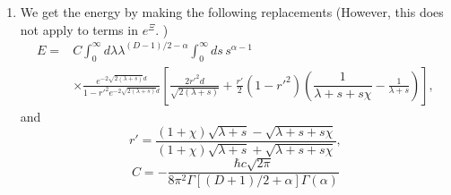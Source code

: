 \begin{enumerate}
\item We get the energy by making the following replacements  
(However, this does not apply to terms in $e^{\Xi}$.  )
 \begin{align}
E=&  C\int_0^\infty d\lambda \lambda^{(D-1)/2-\alpha}\int_0^\infty ds\, s^{\alpha-1}\nonumber\\
&\times  \frac{e^{-2\sqrt{2(\lambda+s)}d}}{1-r'^2e^{-2\sqrt{2(\lambda+s)}d}}
\left[\frac{2r'^2d}{\sqrt{2(\lambda+s)}}+ \frac{r'}{2}(1-r'^2)\left(\dfrac{1}{\lambda+s+s\chi}  -\frac{1}{\lambda+s}\right)\right],
\end{align}
and 
\begin{equation}
r' =  \frac{(1+\chi)\sqrt{\lambda+s}-\sqrt{\lambda+ s + s\chi}}{(1+\chi)\sqrt{\lambda+s}+\sqrt{\lambda+s+s\chi}},
\end{equation}
\begin{equation}
C = -\frac{\hbar c\sqrt{2\pi}}{8\pi^2\Gamma[(D+1)/2+\alpha]\Gamma(\alpha)} 
\end{equation}


\end{enumerate}
